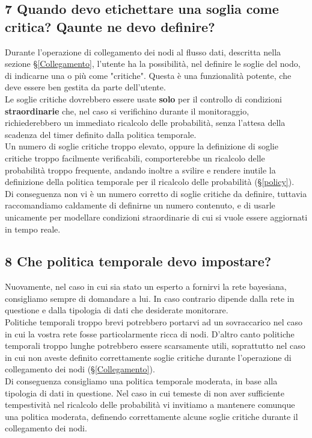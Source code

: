 \subsection*{7 Quando devo etichettare una soglia come critica? Qaunte ne devo definire?}
Durante l'operazione di collegamento dei nodi al flusso dati, descritta nella sezione §\ref{Collegamento}, l'utente ha la possibilità, nel definire le soglie del nodo, di indicarne una o più come "critiche". Questa è una funzionalità potente, che deve essere ben gestita da parte dell'utente.\\
Le soglie critiche dovrebbero essere usate \textbf{solo} per il controllo di condizioni \textbf{straordinarie} che, nel caso si verifichino durante il monitoraggio, richiederebbero un immediato ricalcolo delle probabilità, senza l'attesa della scadenza del timer definito dalla politica temporale.\\
Un numero di soglie critiche troppo elevato, oppure la definizione di soglie critiche troppo facilmente verificabili, comporterebbe un ricalcolo delle probabilità troppo frequente, andando inoltre a svilire e rendere inutile la definizione della politica temporale per il ricalcolo delle probabilità (§\ref{policy}).\\
Di conseguenza non vi è un numero corretto di soglie critiche da definire, tuttavia raccomandiamo caldamente di definirne un numero contenuto, e di usarle unicamente per modellare condizioni straordinarie di cui si vuole essere aggiornati in tempo reale.

\subsection*{8 Che politica temporale devo impostare?}
Nuovamente, nel caso in cui sia stato un esperto a fornirvi la rete bayesiana, consigliamo sempre di domandare a lui. In caso contrario dipende dalla rete in questione e dalla tipologia di dati che desiderate monitorare.\\
Politiche temporali troppo brevi potrebbero portarvi ad un sovraccarico nel caso in cui la vostra rete fosse particolarmente ricca di nodi. D'altro canto politiche temporali troppo lunghe potrebbero essere scarsamente utili, soprattutto nel caso in cui non aveste definito correttamente soglie critiche durante l'operazione di collegamento dei nodi (§\ref{Collegamento}).\\
Di conseguenza consigliamo una politica temporale moderata, in base alla tipologia di dati in questione. Nel caso in cui temeste di non aver sufficiente tempestività nel ricalcolo delle probabilità vi invitiamo a mantenere comunque una politica moderata, definendo correttamente alcune soglie critiche durante il collegamento dei nodi.

